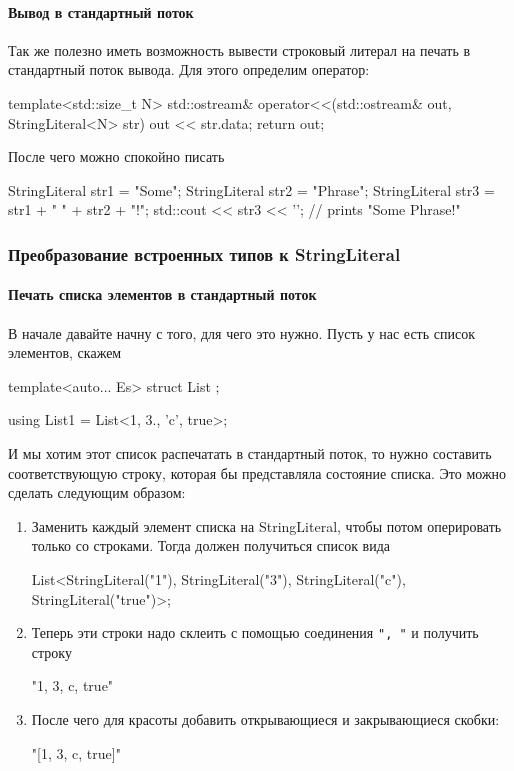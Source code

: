 \paragraph{Вывод в стандартный поток}

Так же полезно иметь возможность вывести строковый литерал на печать в стандартный поток вывода.
Для этого определим оператор:
\begin{cppcode}
template<std::size_t N>
std::ostream& operator<<(std::ostream& out, StringLiteral<N> str) {
  out << str.data;
  return out;
}
\end{cppcode}
После чего можно спокойно писать
\begin{cppcode}
StringLiteral str1 = "Some";
StringLiteral str2 = "Phrase";
StringLiteral str3 = str1 + " " + str2 + "!";
std::cout << str3 << '\n';  // prints "Some Phrase!"
\end{cppcode}

\subsubsection{Преобразование встроенных типов к StringLiteral}

\paragraph{Печать списка элементов в стандартный поток}

В начале давайте начну с того, для чего это нужно.
Пусть у нас есть список элементов, скажем
\begin{cppcode}
template<auto... Es>
struct List {};

using List1 = List<1, 3., 'c', true>;
\end{cppcode}
И мы хотим этот список распечатать в стандартный поток, то нужно составить соответствующую строку, которая бы представляла состояние списка.
Это можно сделать следующим образом:
\begin{enumerate}
\item Заменить каждый элемент списка на StringLiteral, чтобы потом оперировать только со строками.
Тогда должен получиться список вида
\begin{cppcode}
List<StringLiteral("1"), StringLiteral("3"), StringLiteral("c"), StringLiteral("true")>;
\end{cppcode}

\item Теперь эти строки надо склеить с помощью соединения \verb$", "$ и получить строку
\begin{cppcode}
"1, 3, c, true"
\end{cppcode}

\item После чего для красоты добавить открывающиеся и закрывающиеся скобки:
\begin{cppcode}
"[1, 3, c, true]"
\end{cppcode}
\end{enumerate}

